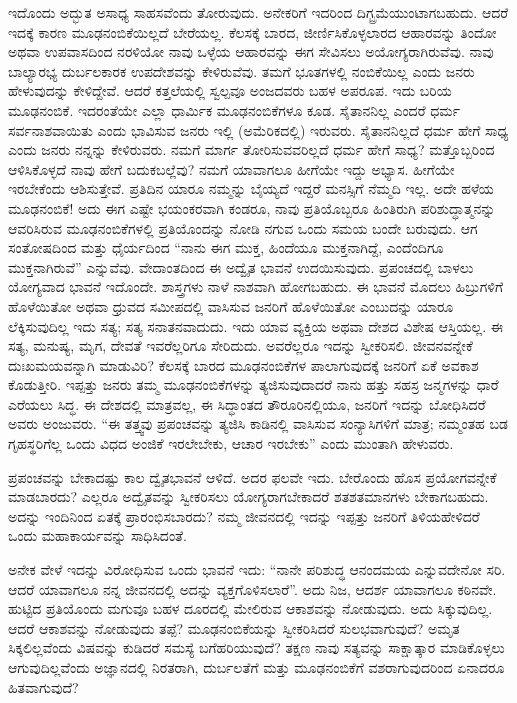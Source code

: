 \eject


ಇದೊಂದು ಅದ್ಭುತ ಅಸಾಧ್ಯ ಸಾಹಸವೆಂದು ತೋರುವುದು. ಅನೇಕರಿಗೆ ಇದರಿಂದ ದಿಗ್ಬ್ರಮೆಯುಂಟಾಗಬಹುದು. ಆದರೆ ಇದಕ್ಕೆ ಕಾರಣ ಮೂಢನಂಬಿಕೆಯಿಲ್ಲದೆ ಬೇರೆಯಲ್ಲ. ಕೆಲಸಕ್ಕೆ ಬಾರದ, ಜೀರ್ಣಿಸಿಕೊಳ್ಳಲಾರದ ಆಹಾರವನ್ನು ತಿಂದೋ ಅಥವಾ ಉಪವಾಸದಿಂದ ನರಳಿಯೋ ನಾವು ಒಳ್ಳೆಯ ಆಹಾರವನ್ನು ಈಗ ಸೇವಿಸಲು ಅಯೋಗ್ಯರಾಗಿರುವೆವು. ನಾವು ಬಾಲ್ಯಾರಭ್ಯ ದುರ್ಬಲಕಾರಕ ಉಪದೇಶವನ್ನು ಕೇಳಿರುವೆವು. ತಮಗೆ ಭೂತಗಳಲ್ಲಿ ನಂಬಿಕೆಯಿಲ್ಲ ಎಂದು ಜನರು ಹೇಳುವುದನ್ನು ಕೇಳಿದ್ದೇವೆ. ಆದರೆ ಕತ್ತಲೆಯಲ್ಲಿ ಸ್ವಲ್ಪವೂ ಅಂಜದವರು ಬಹಳ ಅಪರೂಪ. ಇದು ಬರಿಯ ಮೂಢನಂಬಿಕೆ. ಇದರಂತೆಯೇ ಎಲ್ಲಾ ಧಾರ್ಮಿಕ ಮೂಢನಂಬಿಕೆಗಳೂ ಕೂಡ. ಸೈತಾನನಿಲ್ಲ ಎಂದರೆ ಧರ್ಮ ಸರ್ವನಾಶವಾಯಿತು ಎಂದು ಭಾವಿಸುವ ಜನರು ಇಲ್ಲಿ (ಅಮೆರಿಕದಲ್ಲಿ) ಇರುವರು. ಸೈತಾನನಿಲ್ಲದೆ ಧರ್ಮ ಹೇಗೆ ಸಾಧ್ಯ ಎಂದು ಜನರು ನನ್ನನ್ನು ಕೇಳಿರುವರು. ನಮಗೆ ಮಾರ್ಗ ತೋರಿಸುವವರಿಲ್ಲದೆ ಧರ್ಮ ಹೇಗೆ ಸಾಧ್ಯ? ಮತ್ತೊಬ್ಬರಿಂದ ಆಳಿಸಿಕೊಳ್ಳದೆ ನಾವು ಹೇಗೆ ಬದುಕಬಲ್ಲೆವು? ನಮಗೆ ಯಾವಾಗಲೂ ಹೀಗೆಯೇ ಇದ್ದು ಅಭ್ಯಾಸ. ಹೀಗೆಯೇ ಇರಬೇಕೆಂದು ಆಶಿಸುತ್ತೇವೆ. ಪ್ರತಿದಿನ ಯಾರೂ ನಮ್ಮನ್ನು ಬೈಯ್ಯದೆ ಇದ್ದರೆ ಮನಸ್ಸಿಗೆ ನೆಮ್ಮದಿ ಇಲ್ಲ. ಅದೇ ಹಳೆಯ ಮೂಢನಂಬಿಕೆ! ಅದು ಈಗ ಎಷ್ಟೇ ಭಯಂಕರವಾಗಿ ಕಂಡರೂ, ನಾವು ಪ್ರತಿಯೊಬ್ಬರೂ ಹಿಂತಿರುಗಿ ಪರಿಶುದ್ಧಾತ್ಮನನ್ನು ಆವರಿಸಿರುವ ಮೂಢನಂಬಿಕೆಗಳಲ್ಲಿ ಪ್ರತಿಯೊಂದನ್ನು ನೋಡಿ ನಗುವ ಒಂದು ಸಮಯ ಬಂದೇ ಬರುವುದು. ಆಗ ಸಂತೋಷದಿಂದ ಮತ್ತು ಧೈರ್ಯದಿಂದ “ನಾನು ಈಗ ಮುಕ್ತ, ಹಿಂದೆಯೂ ಮುಕ್ತನಾಗಿದ್ದೆ, ಎಂದೆಂದಿಗೂ ಮುಕ್ತನಾಗಿರುವೆ” ಎನ್ನುವೆವು. ವೇದಾಂತದಿಂದ ಈ ಅದ್ವೈತ ಭಾವನೆ ಉದಯಿಸುವುದು. ಪ್ರಪಂಚದಲ್ಲಿ ಬಾಳಲು ಯೋಗ್ಯವಾದ ಭಾವನೆ ಇದೊಂದೇ. ಶಾಸ್ತ್ರಗಳು ನಾಳೆ ನಾಶವಾಗಿ ಹೋಗಬಹುದು. ಈ ಭಾವನೆ ಮೊದಲು ಹಿಬ್ರುಗಳಿಗೆ ಹೊಳೆಯಿತೋ ಅಥವಾ ಧ್ರುವದ ಸಮೀಪದಲ್ಲಿ ವಾಸಿಸುವ ಜನರಿಗೆ ಹೊಳೆಯಿತೋ ಎಂಬುದನ್ನು ಯಾರೂ ಲೆಕ್ಕಿಸುವುದಿಲ್ಲ ಇದು ಸತ್ಯ; ಸತ್ಯ ಸನಾತನವಾದುದು. ಇದು ಯಾವ ವ್ಯಕ್ತಿಯ ಅಥವಾ ದೇಶದ ವಿಶೇಷ ಆಸ್ತಿಯಲ್ಲ. ಈ ಸತ್ಯ, ಮನುಷ್ಯ, ಮೃಗ, ದೇವತೆ ಇವರೆಲ್ಲರಿಗೂ ಸೇರಿದುದು. ಅವರೆಲ್ಲರೂ ಇದನ್ನು ಸ್ವೀಕರಿಸಲಿ. ಜೀವನವನ್ನೇಕೆ ದುಃಖಮಯವನ್ನಾಗಿ ಮಾಡುವಿರಿ? ಕೆಲಸಕ್ಕೆ ಬಾರದ ಮೂಢನಂಬಿಕೆಗಳ ಪಾಲಾಗುವುದಕ್ಕೆ ಜನರಿಗೆ ಏಕೆ ಅವಕಾಶ ಕೊಡುತ್ತೀರಿ. ಇಪ್ಪತ್ತು ಜನರು ತಮ್ಮ ಮೂಢನಂಬಿಕೆಗಳನ್ನು ತ್ಯಜಿಸುವುದಾದರೆ ನಾನು ಹತ್ತು ಸಹಸ್ರ ಜನ್ಮಗಳನ್ನು ಧಾರೆ ಎರೆಯಲು ಸಿದ್ಧ. ಈ ದೇಶದಲ್ಲಿ ಮಾತ್ರವಲ್ಲ, ಈ ಸಿದ್ಧಾಂತದ ತೌರೂರಿನಲ್ಲಿಯೂ, ಜನರಿಗೆ ಇದನ್ನು ಬೋಧಿಸಿದರೆ ಅವರು ಅಂಜುವರು. “ಈ ತತ್ತ್ವವು ಪ್ರಪಂಚವನ್ನು ತ್ಯಜಿಸಿ ಕಾಡಿನಲ್ಲಿ ವಾಸಿಸುವ ಸಂನ್ಯಾಸಿಗಳಿಗೆ ಮಾತ್ರ; ನಮ್ಮಂತಹ ಬಡ ಗೃಹಸ್ಥರಿಗೆಲ್ಲ ಒಂದು ವಿಧದ ಅಂಜಿಕೆ ಇರಲೇಬೇಕು, ಆಚಾರ ಇರಬೇಕು” ಎಂದು ಮುಂತಾಗಿ ಹೇಳುವರು.

ಪ್ರಪಂಚವನ್ನು ಬೇಕಾದಷ್ಟು ಕಾಲ ದ್ವೈತಭಾವನೆ ಆಳಿದೆ. ಅದರ ಫಲವೇ ಇದು. ಬೇರೊಂದು ಹೊಸ ಪ್ರಯೋಗವನ್ನೇಕೆ ಮಾಡಬಾರದು? ಎಲ್ಲರೂ ಅದ್ವೈತವನ್ನು ಸ್ವೀಕರಿಸಲು ಯೋಗ್ಯರಾಗಬೇಕಾದರೆ ಶತಶತಮಾನಗಳು ಬೇಕಾಗಬಹುದು. ಅದನ್ನು ಇಂದಿನಿಂದ ಏತಕ್ಕೆ ಪ್ರಾರಂಭಿಸಬಾರದು? ನಮ್ಮ ಜೀವನದಲ್ಲಿ ಇದನ್ನು ಇಪ್ಪತ್ತು ಜನರಿಗೆ ತಿಳಿಯಹೇಳಿದರೆ ಒಂದು ಮಹಾಕಾರ್ಯವನ್ನು ಸಾಧಿಸಿದಂತೆ.


ಅನೇಕ ವೇಳೆ ಇದನ್ನು ವಿರೋಧಿಸುವ ಒಂದು ಭಾವನೆ ಇದು: “ನಾನೇ ಪರಿಶುದ್ಧ ಆನಂದಮಯ ಎನ್ನುವದೇನೋ ಸರಿ. ಆದರೆ ಯಾವಾಗಲೂ ನನ್ನ ಜೀವನದಲ್ಲಿ ಅದನ್ನು ವ್ಯಕ್ತಗೊಳಿಸಲಾರೆ”. ಅದು ನಿಜ, ಆದರ್ಶ ಯಾವಾಗಲೂ ಕಠಿನವೇ. ಹುಟ್ಟಿದ ಪ್ರತಿಯೊಂದು ಮಗುವೂ ಬಹಳ ದೂರದಲ್ಲಿ ಮೇಲಿರುವ ಆಕಾಶವನ್ನು ನೋಡುವುದು. ಅದು ಸಿಕ್ಕುವುದಿಲ್ಲ. ಆದರೆ ಆಕಾಶವನ್ನು ನೋಡುವುದು ತಪ್ಪೆ? ಮೂಢನಂಬಿಕೆಯನ್ನು ಸ್ವೀಕರಿಸಿದರೆ ಸುಲಭವಾಗುವುದೆ? ಅಮೃತ ಸಿಕ್ಕಲಿಲ್ಲವೆಂದು ವಿಷವನ್ನು ಕುಡಿದರೆ ಸಮಸ್ಯೆ ಬಗೆಹರಿಯುವುದೆ? ತಕ್ಷಣ ನಾವು ಸತ್ಯವನ್ನು ಸಾಕ್ಷಾತ್ಕಾರ ಮಾಡಿಕೊಳ್ಳಲು ಆಗುವುದಿಲ್ಲವೆಂದು ಅಜ್ಞಾನದಲ್ಲಿ ನಿರತರಾಗಿ, ದುರ್ಬಲತೆಗೆ ಮತ್ತು ಮೂಢನಂಬಿಕೆಗೆ ವಶರಾಗುವುದರಿಂದ ಏನಾದರೂ ಹಿತವಾಗುವುದೆ?

